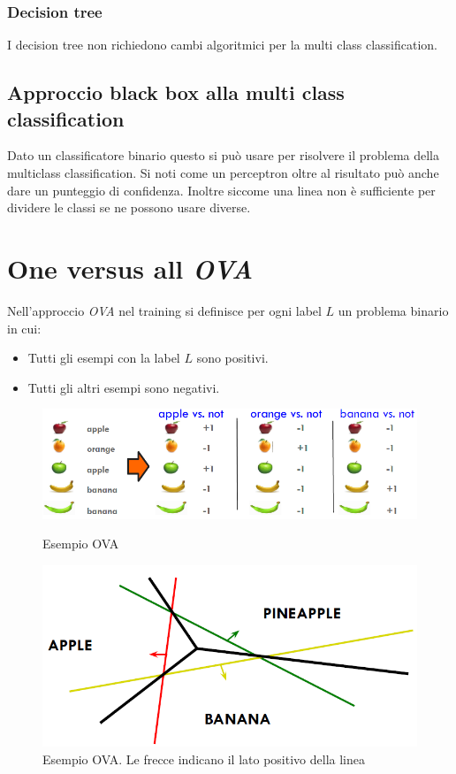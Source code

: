 		\subsubsection{Decision tree}
		I decision tree non richiedono cambi algoritmici per la multi class classification.

	\subsection{Approccio black box alla multi class classification}
	Dato un classificatore binario questo si pu\`o usare per risolvere il problema della multiclass classification.
	Si noti come un perceptron oltre al risultato pu\`o anche dare un punteggio di confidenza.
	Inoltre siccome una linea non \`e sufficiente per dividere le classi se ne possono usare diverse.

\section{One versus all \emph{OVA}}
Nell'approccio \emph{OVA} nel training si definisce per ogni label $L$ un problema binario in cui:
\begin{itemize}
	\item Tutti gli esempi con la label $L$ sono positivi.
	\item Tutti gli altri esempi sono negativi.
\end{itemize}


\begin{figure}
	\centering
	\begin{minipage}{.5\textwidth}
		\centering
		\includegraphics[width=1\linewidth]{imgs/chapter6/img0}
		\caption{Esempio OVA}
		\label{fig:chapter06-00}
	\end{minipage}%
	\begin{minipage}{.5\textwidth}
		\centering
		\includegraphics[width=0.8\linewidth]{imgs/chapter6/img1}
		\caption{Esempio OVA. Le frecce indicano il lato positivo della linea}
		\label{fig:chapter06-01}
	\end{minipage}
\end{figure}

